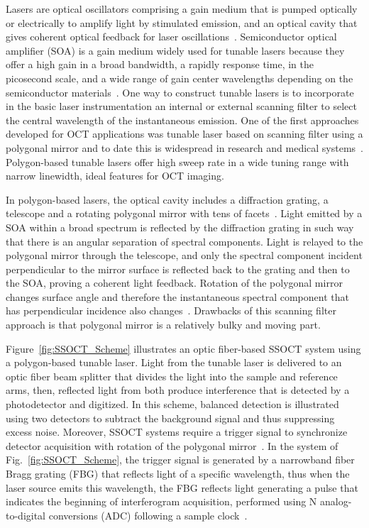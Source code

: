 Lasers are optical oscillators comprising a gain medium that is pumped optically or electrically to amplify light by stimulated emission, and an optical cavity that gives coherent optical feedback for laser oscillations~\cite{Saleh1991_Fundamentals}. Semiconductor optical amplifier (SOA) is a gain medium widely used for tunable lasers because they offer a high gain in a broad bandwidth, a rapidly response time, in the picosecond scale, and a wide range of gain center wavelengths depending on the semiconductor materials~\cite{Yun2015_Wavelength}. One way to construct tunable lasers is to incorporate in the basic laser instrumentation an internal or external scanning filter to select the central wavelength of the instantaneous emission. One of the first approaches developed for OCT applications was tunable laser based on scanning filter using a polygonal mirror and to date this is widespread in research and medical systems~\cite{Yun2003_Highspeed}. Polygon-based tunable lasers offer high sweep rate in a wide tuning range with narrow linewidth, ideal features for OCT imaging.

In polygon-based lasers, the optical cavity includes a diffraction grating, a telescope and a rotating polygonal mirror with tens of facets~\cite{Yun2003_Highspeed}. Light emitted by a SOA within a broad spectrum is reflected by the diffraction grating in such way that there is an angular separation of spectral components. Light is relayed to the polygonal mirror through the telescope, and only the spectral component incident perpendicular to the mirror surface is reflected back to the grating and then to the SOA, proving a coherent light feedback. Rotation of the polygonal mirror changes surface angle and therefore the instantaneous spectral component that has perpendicular incidence also changes~\cite{Yun2003_Highspeed}. Drawbacks of this scanning filter approach is that polygonal mirror is a relatively bulky and moving part.

Figure~\ref{fig:SSOCT_Scheme} illustrates an optic fiber-based SSOCT system using a polygon-based tunable laser. Light from the tunable laser is delivered to an optic fiber beam splitter that divides the light into the sample and reference arms, then, reflected light from both produce interference that is detected by a photodetector and digitized. In this scheme, balanced detection is illustrated using two detectors to subtract the background signal and thus suppressing excess noise\cite{Podoleanu2000_Unbalanced}. Moreover, SSOCT systems require a trigger signal to synchronize detector acquisition with rotation of the polygonal mirror~\cite{Vakoc2005_Phaseresolved}. In the system of Fig.~\ref{fig:SSOCT_Scheme}, the trigger signal is generated by a narrowband fiber Bragg grating (FBG) that reflects light of a specific wavelength, thus when the laser source emits this wavelength, the FBG reflects light generating a pulse that indicates the beginning of interferogram acquisition, performed using N analog-to-digital conversions (ADC) following a sample clock~\cite{Vakoc2005_Phaseresolved}.

